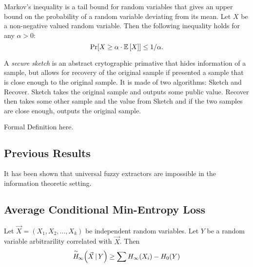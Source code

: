 \begin{definition}
    Markov's inequality is a tail bound for random variables that gives an upper bound on the probability of a random variable deviating from its mean. Let $X$ be a non-negative valued random variable. Then the following inequality holds for any $\alpha > 0$: 
    \[ 
      \Pr\!\left[X \geq \alpha \cdot \operatorname*{\mathbb{E}}\left[X\right]\right] \leq 1/\alpha .
    \]
\end{definition}

\begin{definition}
    A \emph{secure sketch} is an abstract crytographic primative that hides information of a sample, but allows for recovery of the original sample if presented a sample that is close enough to the original sample. It is made of two algorithms: Sketch and Recover. Sketch takes the original sample and outputs some public value. Recover then takes some other sample and the value from Sketch and if the two samples are close enough, outputs the original sample. 

    Formal Definition here. 
\end{definition}

\subsection{Previous Results}
It has been shown that universal fuzzy extractors are impossible in the information theoretic setting. 

\subsection{Average Conditional Min-Entropy Loss}
\begin{lemma}
    \label{lem:conditionalminentloss}
    Let $\vec{X} = (X_1, X_2, \ldots, X_k)$ be independent random variables. 
    Let $Y$ be a random variable arbitrarility correlated with $\vec{X}$. 
    Then 
    \[
        \overset{\sim}{H}\!_{\infty}\!\left(\vec{X}\,|\,Y\right) \geq \sum H_{\infty}\!\left(X_i\right) - H_0\!\left(Y\right)
    \]
\end{lemma} 

